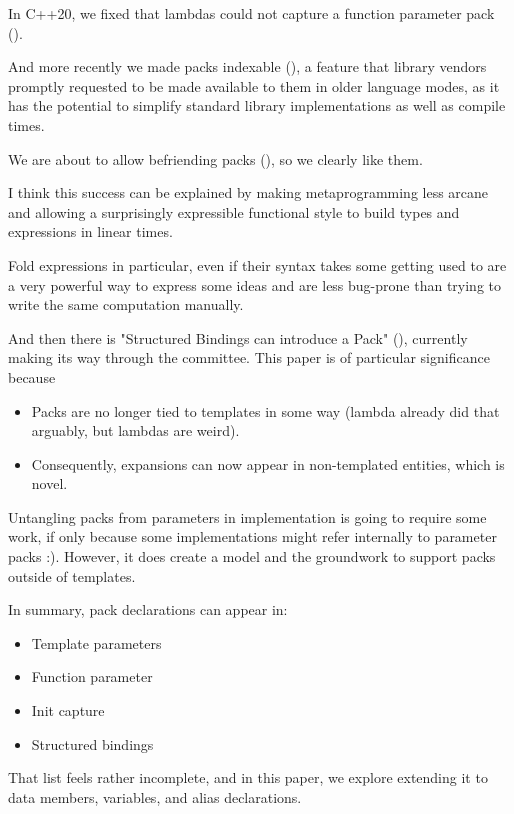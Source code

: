 \documentclass{wg21}
\begin{document}
In C++20, we fixed that lambdas could not capture a function parameter pack ().

And more recently we made packs indexable (), a feature that library vendors promptly requested to be made available to them
in older language modes, as it has the potential to simplify standard library implementations as well as compile times.

We are about to allow befriending packs (), so we clearly like them.

I think this success can be explained by making metaprogramming less arcane and allowing a surprisingly expressible functional style to build
types and expressions in linear times.

Fold expressions in particular, even if their syntax takes some getting used to are a very powerful way to express some ideas and are less bug-prone than trying to write the same computation manually.

And then there is "Structured Bindings can introduce a Pack" (), currently making its way through the committee.
This paper is of particular significance because
\begin{itemize}
    \item Packs are no longer tied to templates in some way (lambda  already did that arguably, but lambdas are weird).
    \item Consequently, expansions can now appear in non-templated entities, which is novel.
\end{itemize}

Untangling packs from parameters in implementation is going to require some work, if only because some implementations might refer internally to parameter packs :).
However, it does create a model and the groundwork to support packs outside of templates.

In summary, pack declarations can appear in:
\begin{itemize}
  \item Template parameters
  \item Function parameter
  \item Init capture
  \item Structured bindings
\end{itemize}

That list feels rather incomplete, and in this paper, we explore extending it to data members, variables, and alias declarations.
\end{document}
